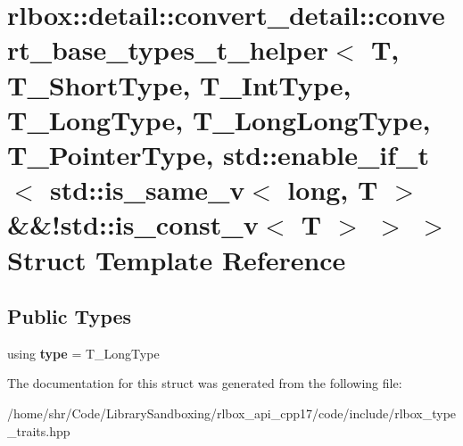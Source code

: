 \hypertarget{structrlbox_1_1detail_1_1convert__detail_1_1convert__base__types__t__helper_3_01T_00_01T__ShortT956ceb54575cc1a39f8f361203064da2}{}\section{rlbox\+:\+:detail\+:\+:convert\+\_\+detail\+:\+:convert\+\_\+base\+\_\+types\+\_\+t\+\_\+helper$<$ T, T\+\_\+\+Short\+Type, T\+\_\+\+Int\+Type, T\+\_\+\+Long\+Type, T\+\_\+\+Long\+Long\+Type, T\+\_\+\+Pointer\+Type, std\+:\+:enable\+\_\+if\+\_\+t$<$ std\+:\+:is\+\_\+same\+\_\+v$<$ long, T $>$ \&\&!std\+:\+:is\+\_\+const\+\_\+v$<$ T $>$ $>$ $>$ Struct Template Reference}
\label{structrlbox_1_1detail_1_1convert__detail_1_1convert__base__types__t__helper_3_01T_00_01T__ShortT956ceb54575cc1a39f8f361203064da2}
\subsection*{Public Types}
\begin{DoxyCompactItemize}
\item 
\mbox{\label{structrlbox_1_1detail_1_1convert__detail_1_1convert__base__types__t__helper_3_01T_00_01T__ShortT956ceb54575cc1a39f8f361203064da2_accfbaf521e8181f1aa9cf484c703905c}} 
using {\bfseries type} = T\+\_\+\+Long\+Type
\end{DoxyCompactItemize}


The documentation for this struct was generated from the following file\+:\begin{DoxyCompactItemize}
\item 
/home/shr/\+Code/\+Library\+Sandboxing/rlbox\+\_\+api\+\_\+cpp17/code/include/rlbox\+\_\+type\+\_\+traits.\+hpp\end{DoxyCompactItemize}
